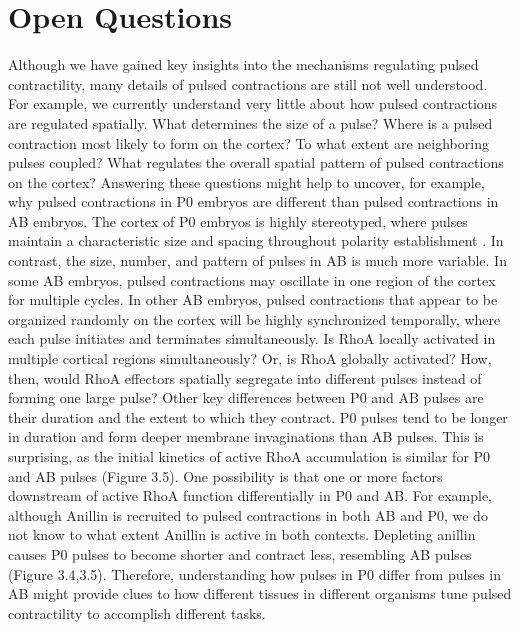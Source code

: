 \documentclass{ucetd}
\begin{document}
\section{Open Questions}
Although we have gained key insights into the mechanisms regulating pulsed contractility, many details of pulsed contractions are still not well understood.  For example, we currently understand very little about how pulsed contractions are regulated spatially.  What determines the size of a pulse?  Where is a pulsed contraction most likely to form on the cortex?  To what extent are neighboring pulses coupled?  What regulates the overall spatial pattern of pulsed contractions on the cortex?  Answering these questions might help to uncover, for example, why pulsed contractions in P0 embryos are different than pulsed contractions in AB embryos.  The cortex of P0 embryos is highly stereotyped, where pulses maintain a characteristic size and spacing throughout polarity establishment \cite{Munro:2004jk}.  In contrast, the size, number, and pattern of pulses in AB is much more variable.  In some AB embryos, pulsed contractions may oscillate in one region of the cortex for multiple cycles.  In other AB embryos, pulsed contractions that appear to be organized randomly on the cortex will be highly synchronized temporally, where each pulse initiates and terminates simultaneously.  Is RhoA locally activated in multiple cortical regions simultaneously?  Or, is RhoA globally activated?  How, then, would RhoA effectors spatially segregate into different pulses instead of forming one large pulse?  Other key differences between P0 and AB pulses are their duration and the extent to which they contract.  P0 pulses tend to be longer in duration and form deeper membrane invaginations than AB pulses.  This is surprising, as the initial kinetics of active RhoA accumulation is similar for P0 and AB pulses (Figure 3.5).  One possibility is that one or more factors downstream of active RhoA function differentially in P0 and AB.  For example, although Anillin is recruited to pulsed contractions in both AB and P0, we do not know to what extent Anillin is active in both contexts.  Depleting anillin causes P0 pulses to become shorter and contract less, resembling AB pulses (Figure 3.4,3.5).  Therefore, understanding how pulses in P0 differ from pulses in AB might provide clues to how different tissues in different organisms tune pulsed contractility to accomplish different tasks. 
\end{document}
